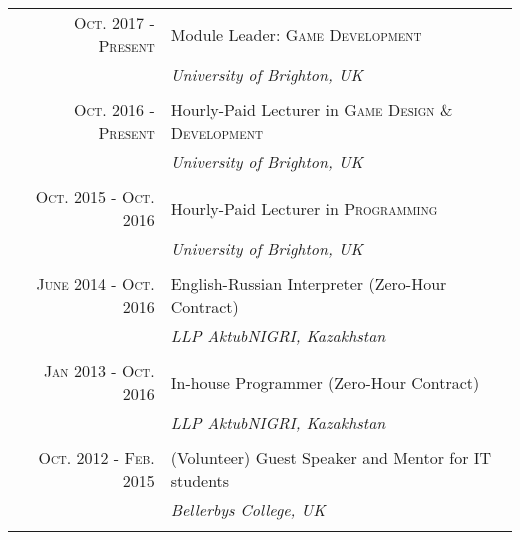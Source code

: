 \documentclass[a4paper,10pt]{article} %
\begin{document}
\begin{tabular}{r|p{11cm}}

\textsc{Oct. 2017 - Present} & Module Leader: \textsc{Game Development}\\
& \emph{University of Brighton, UK}\\
\multicolumn{2}{c}{} \\

\textsc{Oct. 2016 - Present} & Hourly-Paid Lecturer in \textsc{Game Design \& Development}\\
& \emph{University of Brighton, UK}\\
\multicolumn{2}{c}{} \\


\textsc{Oct. 2015 - Oct. 2016} & Hourly-Paid Lecturer in \textsc{Programming}\\
& \emph{University of Brighton, UK}\\
\multicolumn{2}{c}{} \\


\textsc{June 2014 - Oct. 2016} & English-Russian Interpreter (Zero-Hour Contract)\\
& \emph{LLP AktubNIGRI, Kazakhstan}\\
\multicolumn{2}{c}{} \\


\textsc{Jan 2013 - Oct. 2016} & In-house Programmer (Zero-Hour Contract)\\
& \emph{LLP AktubNIGRI, Kazakhstan}\\
\multicolumn{2}{c}{} \\


\textsc{Oct. 2012 - Feb. 2015} & (Volunteer) Guest Speaker and Mentor for IT students\\
& \emph{Bellerbys College, UK}\\
\multicolumn{2}{c}{} \\

\end{tabular}
\vspace{0.1cm}

\end{document}
